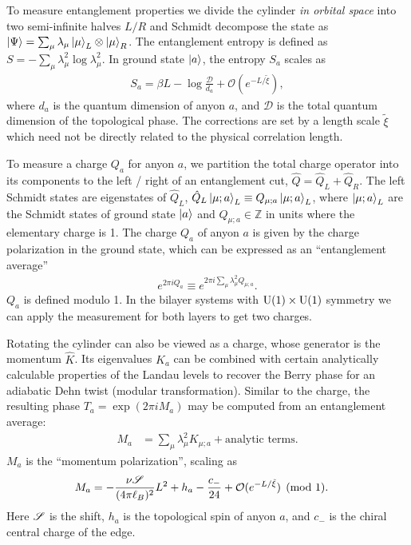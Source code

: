 To measure entanglement properties we divide the cylinder \emph{in orbital space} into two semi-infinite halves $L/R$ and Schmidt decompose the state as $ \ket{\Psi} = \sum_\mu \lambda_\mu \ket{\mu}_{ L} \otimes \ket{\mu}_{ R}$.
The entanglement entropy is defined as $S= - \sum_\mu \lambda_\mu^2 \log \lambda_\mu^2$.
In ground state $\ket{a}$, the entropy $S_a$ scales as \cite{KitaevPreskill,LevinWen} 
\begin{align}
	S_a = \beta L - \log\frac{\mathcal{D}}{d_a} + \mathcal{O}(e^{-L / \tilde{\xi}}),
	\label{eq:TEE}
\end{align}
where $d_a$ is the quantum dimension of anyon $a$, and $\mathcal{D}$ is the total quantum dimension of the topological phase.
The corrections are set by a length scale $\tilde{\xi}$ which need not be directly related to the physical correlation length.

To measure a \Uone charge $Q_a$ for anyon $a$, we partition the total charge operator into its components to the left / right of an entanglement cut, $\hat{Q} = \hat{Q}_L + \hat{Q}_R$. 
The left Schmidt states are eigenstates of $\hat{Q}_L$, $\hat{Q}_L \ket{\mu; a}_L \equiv Q_{\mu; a} \ket{\mu; a}_L $, where $\ket{\mu; a}_L$ are the Schmidt states of ground state $\ket{a}$ and $Q_{\mu; a} \in \mathbb{Z}$ in units where the elementary charge is 1.
The charge $Q_a$ of anyon $a$ is given by the charge polarization in the ground state, which can be expressed as an ``entanglement average'' \cite{ZaletelQHdmrg13}
\begin{align}
	e^{2 \pi i Q_a} \equiv e^{2 \pi i \sum_\mu \lambda^2_\mu Q_{\mu; a}}.
\end{align}
$Q_a$ is defined modulo 1.
In the bilayer systems with $\mathrm{U(1)}\times\mathrm{U(1)}$ symmetry we can apply the measurement for both layers to get two charges.

Rotating the cylinder can also be viewed as a \Uone charge, whose generator is the momentum $\hat{K}$.
Its eigenvalues $K_a$ can be combined with certain analytically calculable properties of the Landau levels to recover 
the Berry phase for an adiabatic Dehn twist (modular transformation).
Similar to the charge, the resulting phase $T_a = \exp(2\pi i M_a)$ may be computed from an entanglement average:
\begin{align}
	M_a &=  \sum_\mu \lambda^2_\mu K_{\mu; a} + \textrm{analytic terms} .
\end{align}
$M_a$ is the ``momentum polarization'', scaling as \cite{ZaletelQHdmrg13,HHTuMomPol13}
\begin{align}
	M_a &= -\frac{\nu\mathscr{S}}{(4\pi\ell_B)^2}L^2 + h_a - \frac{c_-}{24} + \mathcal{O}(e^{-L / \tilde{\xi}}) \pmod{1}.
	\label{mompol}
\end{align}
Here $\mathscr{S}$ is the shift, $h_a$ is the topological spin of anyon $a$, and $c_-$ is the chiral central charge of the edge.


